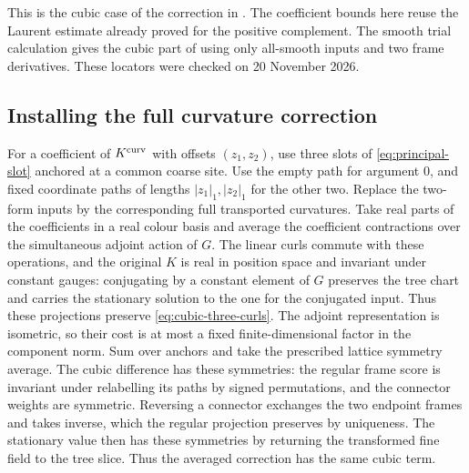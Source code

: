 \documentclass[11pt,reqno]{amsart}
\numberwithin{equation}{section}
\theoremstyle{definition}
\theoremstyle{remark}
\begin{document}
This is the cubic case of the correction in
\cite[Lemma~36.3, pp.~230--232]{Main}. The coefficient
bounds here reuse the Laurent estimate already proved
for the positive complement. The smooth trial
calculation gives the cubic part of
\cite[Proposition~36.6 and (36.12), pp.~240--243]{Main}
using only all-smooth inputs and two frame derivatives.
These locators were checked on 20 November 2026.

\subsection{Installing the full curvature correction}

For a coefficient of \(K^{\rm curv}\) with offsets
\((z_1,z_2)\), use three slots of
\eqref{eq:principal-slot} anchored at a common coarse
site. Use the empty path for argument \(0\), and fixed
coordinate paths of lengths \(|z_1|_1,|z_2|_1\) for
the other two. Replace the two-form inputs by the
corresponding full transported curvatures. Take real
parts of the coefficients in a real colour basis and
average the coefficient contractions over the simultaneous
adjoint action of \(G\). The linear curls commute with
these operations, and the original \(K\) is real in
position space and invariant under constant gauges:
conjugating by a constant element of \(G\) preserves
the tree chart and carries the stationary solution to
the one for the conjugated input.
Thus these projections preserve
\eqref{eq:cubic-three-curls}. The adjoint representation
is isometric, so their cost is at most a fixed
finite-dimensional factor in the component norm.
Sum over anchors and take the prescribed lattice symmetry
average. The cubic difference has these symmetries: the
regular frame score is invariant under relabelling its
paths by signed permutations, and the connector weights
are symmetric. Reversing a connector exchanges the two
endpoint frames and takes inverse, which the regular
projection preserves by uniqueness. The stationary
value then has these symmetries by returning the
transformed fine field to the tree slice. Thus the
averaged correction has the same cubic term.
\end{document}
